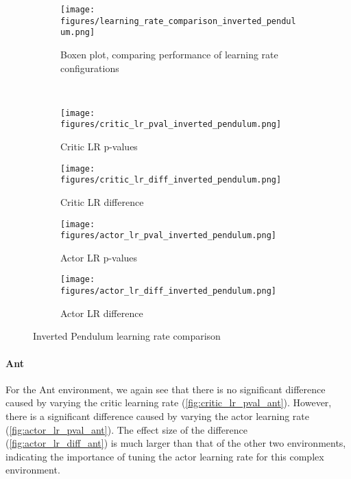 \documentclass{article}
\begin{document}
\begin{figure}[htbp]
    \centering
    \begin{subfigure}{0.4\textwidth}
        \centering
        \texttt{[image: figures/learning\_rate\_comparison\_inverted\_pendulum.png]}
        \captionsetup{justification=centering}
        \caption{Boxen plot, comparing performance of learning rate configurations}
        \label{fig:learning_rate_comparison_inverted_pendulum}
    \end{subfigure}
    \\
    \begin{subfigure}{0.24\textwidth}
        \centering
        \texttt{[image: figures/critic\_lr\_pval\_inverted\_pendulum.png]}
        \captionsetup{justification=centering}
        \caption{Critic LR p-values}
        \label{fig:critic_lr_pval_inverted_pendulum}
    \end{subfigure}
    \begin{subfigure}{0.24\textwidth}
        \centering
        \texttt{[image: figures/critic\_lr\_diff\_inverted\_pendulum.png]}
        \captionsetup{justification=centering}
        \caption{Critic LR difference}
        \label{fig:critic_lr_diff_inverted_pendulum}
    \end{subfigure}
    \begin{subfigure}{0.24\textwidth}
        \centering
        \texttt{[image: figures/actor\_lr\_pval\_inverted\_pendulum.png]}
        \captionsetup{justification=centering}
        \caption{Actor LR p-values}
        \label{fig:actor_lr_pval_inverted_pendulum}
    \end{subfigure}
    \begin{subfigure}{0.24\textwidth}
        \centering
        \texttt{[image: figures/actor\_lr\_diff\_inverted\_pendulum.png]}
        \captionsetup{justification=centering}
        \caption{Actor LR difference}
        \label{fig:actor_lr_diff_inverted_pendulum}
    \end{subfigure}
    \caption{Inverted Pendulum learning rate comparison}
    \label{fig:inverted_pendulum_analysis}
\end{figure}
\clearpage

\paragraph{Ant}
For the Ant environment, we again see that there is no significant difference caused by varying the critic learning rate (\autoref{fig:critic_lr_pval_ant}). However, there is a significant difference caused by varying the actor learning rate (\autoref{fig:actor_lr_pval_ant}). The effect size of the difference (\autoref{fig:actor_lr_diff_ant}) is much larger than that of the other two environments, indicating the importance of tuning the actor learning rate for this complex environment.
\end{document}
